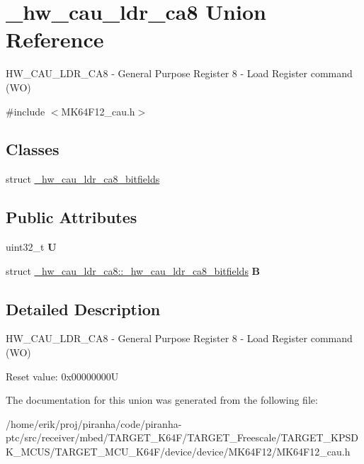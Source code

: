 \hypertarget{union__hw__cau__ldr__ca8}{}\section{\+\_\+hw\+\_\+cau\+\_\+ldr\+\_\+ca8 Union Reference}
\label{union__hw__cau__ldr__ca8}


H\+W\+\_\+\+C\+A\+U\+\_\+\+L\+D\+R\+\_\+\+C\+A8 -\/ General Purpose Register 8 -\/ Load Register command (WO)  




{\ttfamily \#include $<$M\+K64\+F12\+\_\+cau.\+h$>$}

\subsection*{Classes}
\begin{DoxyCompactItemize}
\item 
struct \hyperlink{struct__hw__cau__ldr__ca8_1_1__hw__cau__ldr__ca8__bitfields}{\+\_\+hw\+\_\+cau\+\_\+ldr\+\_\+ca8\+\_\+bitfields}
\end{DoxyCompactItemize}
\subsection*{Public Attributes}
\begin{DoxyCompactItemize}
\item 
uint32\+\_\+t {\bfseries U}\hypertarget{union__hw__cau__ldr__ca8_ac318b45e31710355e0d46a64029ce60e}{}\label{union__hw__cau__ldr__ca8_ac318b45e31710355e0d46a64029ce60e}

\item 
struct \hyperlink{struct__hw__cau__ldr__ca8_1_1__hw__cau__ldr__ca8__bitfields}{\+\_\+hw\+\_\+cau\+\_\+ldr\+\_\+ca8\+::\+\_\+hw\+\_\+cau\+\_\+ldr\+\_\+ca8\+\_\+bitfields} {\bfseries B}\hypertarget{union__hw__cau__ldr__ca8_a51aef0fd36ad2d13d133734bc972883e}{}\label{union__hw__cau__ldr__ca8_a51aef0fd36ad2d13d133734bc972883e}

\end{DoxyCompactItemize}


\subsection{Detailed Description}
H\+W\+\_\+\+C\+A\+U\+\_\+\+L\+D\+R\+\_\+\+C\+A8 -\/ General Purpose Register 8 -\/ Load Register command (WO) 

Reset value\+: 0x00000000U 

The documentation for this union was generated from the following file\+:\begin{DoxyCompactItemize}
\item 
/home/erik/proj/piranha/code/piranha-\/ptc/src/receiver/mbed/\+T\+A\+R\+G\+E\+T\+\_\+\+K64\+F/\+T\+A\+R\+G\+E\+T\+\_\+\+Freescale/\+T\+A\+R\+G\+E\+T\+\_\+\+K\+P\+S\+D\+K\+\_\+\+M\+C\+U\+S/\+T\+A\+R\+G\+E\+T\+\_\+\+M\+C\+U\+\_\+\+K64\+F/device/device/\+M\+K64\+F12/M\+K64\+F12\+\_\+cau.\+h\end{DoxyCompactItemize}
